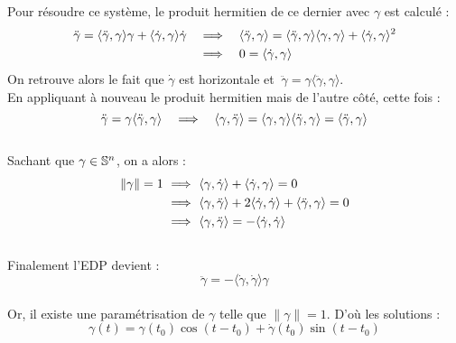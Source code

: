 Pour résoudre ce système, le produit hermitien de ce dernier avec $\gamma$ est calculé :
\begin{align*}
	\ddot{\gamma} =  \langle \ddot{\gamma},\gamma\rangle \gamma + \langle  \dot{\gamma}, \gamma \rangle \dot{\gamma} \quad 
	&\Lr\quad \langle \ddot{\gamma}, \gamma \rangle =  \langle \ddot{\gamma},\gamma\rangle \langle \gamma, \gamma \rangle + \langle  \dot{\gamma}, \gamma \rangle^2 \\
	&\Lr\quad 0 =  \langle  \dot{\gamma}, \gamma \rangle
\end{align*}
On retrouve alors le fait que $\dot{\gamma}$ est horizontale et $\ \ddot{\gamma} = \gamma \langle \ddot{\gamma},\gamma\rangle$.
\\
En appliquant à nouveau le produit hermitien mais de l'autre côté, cette fois :
\[\ddot{\gamma} = \gamma \langle \ddot{\gamma},\gamma\rangle\quad 
\Lr\quad \langle \gamma, \ddot{\gamma} \rangle = \langle  \gamma, \gamma \rangle \langle \ddot{\gamma},\gamma\rangle  =  \langle  \ddot{\gamma}, \gamma \rangle\]
\\
Sachant que $\gamma\in\S{n}$, on a alors :
\begin{align*}
	\| \gamma \| = 1\ &\Lr\ \langle \gamma, \dot{\gamma} \rangle + \langle \dot{\gamma}, \gamma \rangle =0 \\
	&\Lr\ \langle \gamma, \ddot{\gamma} \rangle + 2\langle \dot{\gamma}, \dot{\gamma} \rangle + \langle \ddot{\gamma}, \gamma \rangle =0 \\
	&\Lr\ \langle \gamma, \ddot{\gamma} \rangle = - \langle \dot{\gamma}, \dot{\gamma} \rangle
\end{align*}
\\
Finalement l'EDP devient :
\[\ddot{\gamma} = - \langle \dot{\gamma}, \dot{\gamma} \rangle \gamma \]
\\
Or, il existe une paramétrisation de $\gamma$ telle que $\|\gamma\| = 1$. D'où les solutions :
\[\gamma(t) = \gamma(t_0) \cos (t - t_0) + \dot{\gamma}(t_0) \sin (t - t_0)\]







